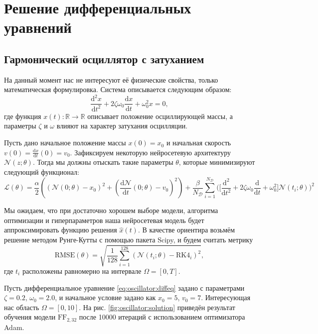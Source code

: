 \documentclass[a4paper, 12pt]{article}
\begin{document}
\section{Решение дифференциальных уравнений} \label{section:diffeqsolving}

\subsection{Гармонический осциллятор с затуханием}

На данный момент нас не интересуют её физические свойства, только математическая формулировка. Система описывается следующим образом:
\begin{equation} \label{eq:oscillator:diffeq}
    \frac{\mathrm{d}^2 x}{\mathrm{d} t^2} + 2\zeta \omega_0\frac {\mathrm {d} x}{\mathrm {d} t} + \omega _0^2x = 0,
\end{equation}
где функция $x(t) : \mathbb{R} \to \mathbb{R}$ описывает положение осциллирующей массы, а параметры $\zeta$ и $\omega$ влияют на характер затухания осцилляции.

Пусть дано начальное положение массы $x(0) = x_0$ и начальная скорость $v(0) = \frac{\mathrm{d} x}{\mathrm{d} t}(0) = v_0$. Зафиксируем некоторую нейросетевую архитектуру $\mathcal{N}(z; \theta)$. Тогда мы должны отыскать такие параметры $\theta$, которые минимизируют следующий функционал:
\begin{equation*}
    \mathcal{L}(\theta) = \frac{\alpha}{2}((\mathcal{N}(0; \theta) - x_0)^2 + (\frac{\mathrm{d}\mathcal{N}}{\mathrm{d}t}(0; \theta) - v_0)^2) + \frac{\beta}{N_{\mathcal{D}}} \sum_{i = 1}^{N_{\mathcal{D}}} \Big(\Big[\frac{\mathrm{d}^2}{\mathrm{d} t^2} + 2\zeta \omega_0\frac {\mathrm {d}}{\mathrm {d} t} + \omega _0^2\Big]\mathcal{N}(t_i; \theta)\Big)^2
\end{equation*}

Мы ожидаем, что при достаточно хорошем выборе модели, алгоритма оптимизации и гиперпараметров наша нейросетевая модель будет аппроксимировать функцию решения $\hat{x}(t)$. В качестве ориентира возьмём решение методом Рунге-Кутты с помощью пакета Scipy, и будем считать метрику
$$
\mathrm{RMSE}(\theta) = \sqrt{\frac{1}{128}\sum_{i=1}^{128}(\mathcal{N}(t_i;\theta) - \mathrm{RK4}_i)^2},
$$
где $t_i$ расположены равномерно на интервале $\Omega = [0, T]$.

Пусть дифференциальное уравнение \ref{eq:oscillator:diffeq} задано с параметрами $\zeta = 0.2$, $\omega_0 = 2.0$, и начальное условие задано как $x_0 = 5$, $v_0 = 7$. Интересующая нас область $\Omega = [0, 10]$. На рис. \ref{fig:oscillator:solution} приведён результат обучения модели $\mathrm{FF}_{2, 32}$ после 10000 итераций с использованием оптимизатора Adam.
\end{document}
